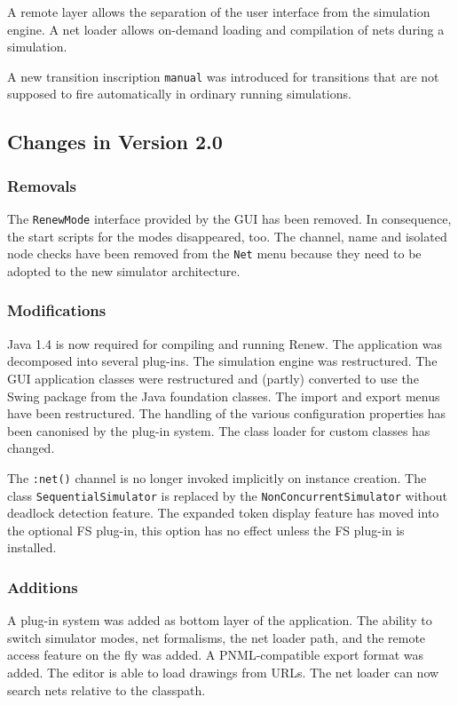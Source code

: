 A remote layer allows the separation of the user interface from the
simulation engine.
A net loader allows on-demand loading and compilation of nets
during a simulation.

A new transition inscription \texttt{manual} was introduced
for transitions that are not supposed to fire automatically
in ordinary running simulations.


\subsection{Changes in Version 2.0}

\subsubsection*{Removals}

The \texttt{RenewMode} interface provided by the GUI has been removed.
In consequence, the start scripts for the modes disappeared, too.
The channel, name and isolated node checks have been removed from the
\texttt{Net} menu because they need to be adopted to the new
simulator architecture.

\subsubsection*{Modifications}

Java 1.4 is now required for compiling and running Renew.
The application was decomposed into several plug-ins.
The simulation engine was restructured.
The GUI application classes were restructured and (partly) converted
to use the Swing package from the Java foundation classes.
The import and export menus have been restructured.
The handling of the various configuration properties has been
canonised by the plug-in system.
The class loader for custom classes has changed.

The \texttt{:net()} channel is no longer invoked implicitly on
instance creation.
The class \texttt{SequentialSimulator} is replaced by the
\texttt{NonConcurrentSimulator} without deadlock detection
feature.
The expanded token display feature has moved into the optional FS
plug-in, this option has no effect unless the FS plug-in is
installed.

\subsubsection*{Additions}

A plug-in system was added as bottom layer of the application.
The ability to switch simulator modes, net formalisms, the net loader
path, and the remote access feature on the fly was added.
A PNML-compatible export format was added.
The editor is able to load drawings from URLs.
The net loader can now search nets relative to the classpath.

